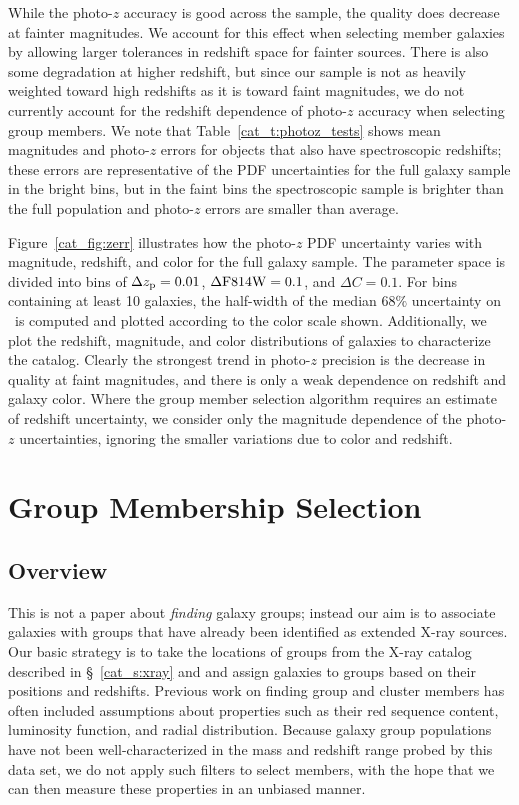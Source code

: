 While the photo-$z$ accuracy is good across the sample, the quality does
decrease at fainter magnitudes. We account for this effect when
selecting member galaxies by allowing larger tolerances in redshift
space for fainter sources. There is also some degradation at higher redshift,
but since our sample is not as heavily weighted toward high redshifts
as it is toward faint magnitudes, we do not currently account for the
redshift dependence of photo-$z$ accuracy when selecting group members.
We note that Table~\ref{cat_t:photoz_tests} shows mean magnitudes and
photo-$z$ errors for objects that also have spectroscopic redshifts;
these errors are representative of the PDF uncertainties for the full
galaxy sample in the bright bins, but in the faint bins the
spectroscopic sample is brighter than the full population and
photo-$z$ errors are smaller than average.

Figure~\ref{cat_fig:zerr} illustrates how the photo-$z$ PDF uncertainty varies with
magnitude, redshift, and color for the full galaxy sample. The parameter space is divided into
bins of $\Delta\mbox{$z_{\rm p}$}=0.01$, $\Delta \rm{F814W}=0.1$, and $\Delta C=0.1$. For
bins containing at least 10 galaxies, the half-width of the median
$68\%$ uncertainty on \pz\ is computed and plotted according to the
color scale shown. Additionally, we plot the redshift, magnitude, and
color distributions of galaxies to characterize the catalog. Clearly
the strongest trend in photo-$z$ precision is the decrease in quality at
faint magnitudes, and there is only a weak dependence on redshift and galaxy
color. Where the group member selection
algorithm requires an estimate of redshift uncertainty, we consider
only the magnitude dependence of the photo-$z$ uncertainties, ignoring
the smaller variations due to color and redshift.



\section{Group Membership Selection}
\label{cat_s:membership}
\subsection{Overview}

This is not a paper about \textit{finding} galaxy groups; instead our aim is to
associate galaxies with groups that have already been identified as
extended X-ray sources. Our basic strategy is to take the locations of
groups from the X-ray catalog described in \S~\ref{cat_s:xray} and
\citet[][and in prep.]{Finoguenov2007} and assign galaxies
to groups based on their positions and redshifts. Previous work on
finding group and cluster members has often included assumptions about
properties such as their red sequence content, luminosity function, and radial
distribution. Because galaxy group populations have not been
well-characterized in the mass and redshift range probed by this data 
set, we do not apply such filters to select members, with the hope
that we can then measure these properties in an unbiased manner.

